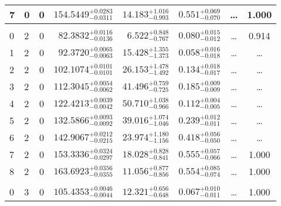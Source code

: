 \begin{table*}[!]
\begin{tabular}{llcrrlrc}
7 & 0 & 0 & $    154.5449_{-      0.0311}^{+      0.0283}$ & $      14.183_{-       0.993}^{+       1.016}$ & $       0.551_{-       0.070}^{+       0.069}$ & \multicolumn{1}{c}{\dots} & 1.000\\[1pt]
\hline \\[-8pt]
0 & 2 & 0 & $     82.3832_{-      0.0136}^{+      0.0116}$ & $       6.522_{-       0.767}^{+       0.848}$ & $       0.080_{-       0.012}^{+       0.015}$ & \multicolumn{1}{c}{\dots} & 0.914\\[1pt]
1 & 2 & 0 & $     92.3720_{-      0.0063}^{+      0.0065}$ & $      15.428_{-       1.373}^{+       1.355}$ & $       0.058_{-       0.018}^{+       0.016}$ & \multicolumn{1}{c}{\dots} & \dots \\[1pt]
2 & 2 & 0 & $    102.1074_{-      0.0101}^{+      0.0101}$ & $      26.153_{-       1.492}^{+       1.478}$ & $       0.134_{-       0.017}^{+       0.018}$ & \multicolumn{1}{c}{\dots} & \dots \\[1pt]
3 & 2 & 0 & $    112.3045_{-      0.0062}^{+      0.0054}$ & $      41.496_{-       0.725}^{+       0.759}$ & $       0.185_{-       0.009}^{+       0.009}$ & \multicolumn{1}{c}{\dots} & \dots\\[1pt]
4 & 2 & 0 & $    122.4213_{-      0.0042}^{+      0.0039}$ & $      50.710_{-       0.966}^{+       1.038}$ & $       0.112_{-       0.005}^{+       0.004}$ & \multicolumn{1}{c}{\dots} & \dots \\[1pt]
5 & 2 & 0 & $    132.5866_{-      0.0092}^{+      0.0093}$ & $      39.016_{-       1.046}^{+       1.074}$ & $       0.239_{-       0.011}^{+       0.012}$ & \multicolumn{1}{c}{\dots} & \dots \\[1pt]
6 & 2 & 0 & $    142.9067_{-      0.0215}^{+      0.0212}$ & $      23.974_{-       1.156}^{+       1.180}$ & $       0.418_{-       0.050}^{+       0.056}$ & \multicolumn{1}{c}{\dots} & \dots \\[1pt]
7 & 2 & 0 & $    153.3336_{-      0.0297}^{+      0.0324}$ & $      18.028_{-       0.841}^{+       0.828}$ & $       0.555_{-       0.066}^{+       0.057}$ & \multicolumn{1}{c}{\dots} & 1.000\\[1pt]
8 & 2 & 0 & $    163.6923_{-      0.0355}^{+      0.0356}$ & $      11.056_{-       0.856}^{+       0.877}$ & $       0.554_{-       0.074}^{+       0.085}$ & \multicolumn{1}{c}{\dots} & 1.000\\[1pt]
\hline \\[-8pt]
0 & 3 & 0 & $    105.4353_{-      0.0044}^{+      0.0046}$ & $      12.321_{-       0.648}^{+       0.656}$ & $       0.067_{-       0.011}^{+       0.010}$ & \multicolumn{1}{c}{\dots} & 1.000\\[1pt]

\end{tabular}
\end{table*}
